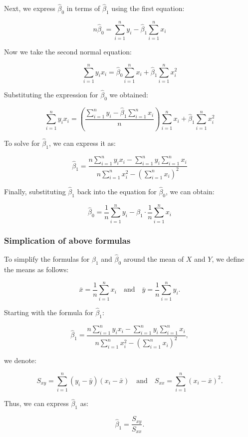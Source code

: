 Next, we express \(\hat{\beta}_0\) in terms of \(\hat{\beta}_1\) using the first equation:

\[
n\hat{\beta}_0 = \sum_{i=1}^{n} y_i - \hat{\beta}_1 \sum_{i=1}^{n} x_i
\]

Now we take the second normal equation:

\[
\sum_{i=1}^{n} y_i x_i = \hat{\beta}_0 \sum_{i=1}^{n} x_i + \hat{\beta}_1 \sum_{i=1}^{n} x_i^2
\]

Substituting the expression for \(\hat{\beta}_0\) we obtained:

\[
\sum_{i=1}^{n} y_i x_i = \left( \frac{\sum_{i=1}^{n} y_i - \hat{\beta}_1 \sum_{i=1}^{n} x_i}{n} \right) \sum_{i=1}^{n} x_i + \hat{\beta}_1 \sum_{i=1}^{n} x_i^2
\]

To solve for \(\hat{\beta}_1\), we can express it as:

\[
\hat{\beta}_1 = \frac{n\sum_{i=1}^{n} y_i x_i - \sum_{i=1}^{n} y_i \sum_{i=1}^{n} x_i}{n\sum_{i=1}^{n} x_i^2 - \left( \sum_{i=1}^{n} x_i \right)^2} \tag{1.2}
\]

Finally, substituting \(\hat{\beta}_1\) back into the equation for \(\hat{\beta}_0\), we can obtain:

\[
\hat{\beta}_0 = \frac{1}{n}\sum_{i=1}^{n} y_i - \hat{\beta}_1 \cdot \frac{1}{n}\sum_{i=1}^{n} x_i \tag{1.3}
\]

\subsubsection{Simplication of above formulas}

To simplify the formulas for \(\hat{\beta}_1\) and \(\hat{\beta}_0\) around the mean of \(X\) and \(Y\), we define the means as follows:

\[
\bar{x} = \frac{1}{n}\sum_{i=1}^{n} x_i \quad \text{and} \quad \bar{y} = \frac{1}{n}\sum_{i=1}^{n} y_i.
\]

Starting with the formula for \(\hat{\beta}_1\):

\[
\hat{\beta}_1 = \frac{n\sum_{i=1}^{n} y_i x_i - \sum_{i=1}^{n} y_i \sum_{i=1}^{n} x_i}{n\sum_{i=1}^{n} x_i^2 - \left( \sum_{i=1}^{n} x_i \right)^2},
\]

we denote:

\[
S_{xy} = \sum_{i=1}^{n} (y_i - \bar{y})(x_i - \bar{x}) \quad \text{and} \quad S_{xx} = \sum_{i=1}^{n} (x_i - \bar{x})^2.
\]

Thus, we can express \(\hat{\beta}_1\) as:

\[
\hat{\beta}_1 = \frac{S_{xy}}{S_{xx}}.
\]

